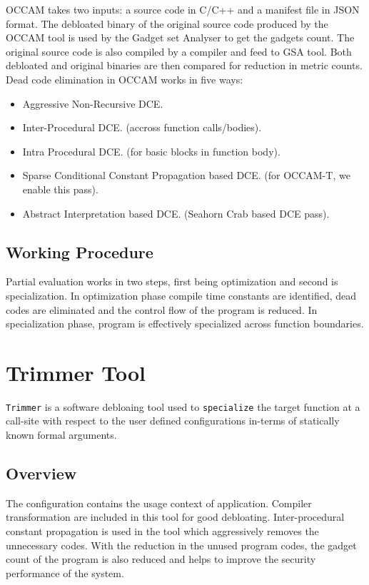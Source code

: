 \documentclass{relatorio}
\begin{document}
OCCAM takes two inputs: a source code in C/C++ and a manifest file in JSON format. The debloated binary of the original source code produced by the OCCAM tool 
is used by the Gadget set Analyser to get the gadgets count. The original source code is also compiled by a compiler and feed to GSA tool. Both debloated and original binaries are then compared for reduction in metric counts. Dead code elimination in OCCAM works in five ways:

\begin{itemize}
	\item Aggressive Non-Recursive DCE.
	\item Inter-Procedural DCE.
(accross function calls/bodies).
	\item Intra Procedural DCE.
(for basic blocks in function body).
	\item Sparse Conditional Constant Propagation based DCE.
(for OCCAM-T, we enable this pass).
	\item Abstract Interpretation based DCE. (Seahorn Crab based DCE pass).
\end{itemize}

\subsection{Working Procedure}%
Partial evaluation works in two steps, first being optimization and second is specialization.
In optimization phase compile time constants are identified, dead codes are eliminated and the control flow of the program is reduced. In specialization phase, program is effectively specialized across function boundaries.

\section{Trimmer Tool}%

\texttt{Trimmer} is a software debloaing tool used to \texttt{specialize} the target function at a call-site with respect to the user defined configurations in-terms of statically known formal arguments.

\subsection{Overview}%
\label{Tools}

The configuration contains the usage context of application. Compiler transformation are included in this tool for good debloating. Inter-procedural constant propagation is used in the tool which aggressively removes the unnecessary codes. With the reduction in the unused program codes, the gadget count of the program is also reduced and helps to improve the security performance of the system. 
\end{document}
